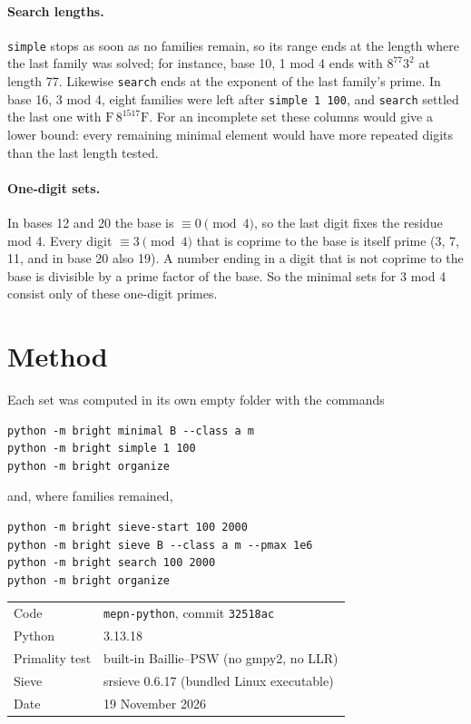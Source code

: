 \documentclass[11pt]{article}
\newcommand{\code}[1]{\texttt{#1}}
\begin{document}
\paragraph{Search lengths.} \code{simple} stops as soon as no families remain, so its range ends at the length where the last family was solved; for instance, base 10, 1 mod 4 ends with $8^{77}3^2$ at length 77. Likewise \code{search} ends at the exponent of the last family's prime. In base 16, 3 mod 4, eight families were left after \code{simple 1 100}, and \code{search} settled the last one with $\mathrm{F}\,8^{1517}\mathrm{F}$. For an incomplete set these columns would give a lower bound: every remaining minimal element would have more repeated digits than the last length tested.

\paragraph{One-digit sets.} In bases 12 and 20 the base is $\equiv 0 \pmod 4$, so the last digit fixes the residue mod 4. Every digit $\equiv 3 \pmod 4$ that is coprime to the base is itself prime (3, 7, 11, and in base 20 also 19). A number ending in a digit that is not coprime to the base is divisible by a prime factor of the base. So the minimal sets for 3 mod 4 consist only of these one-digit primes.

\section{Method}

Each set was computed in its own empty folder with the commands
\begin{verbatim}
python -m bright minimal B --class a m
python -m bright simple 1 100
python -m bright organize
\end{verbatim}
and, where families remained,
\begin{verbatim}
python -m bright sieve-start 100 2000
python -m bright sieve B --class a m --pmax 1e6
python -m bright search 100 2000
python -m bright organize
\end{verbatim}

\begin{center}
\begin{tabular}{@{}ll@{}}
\toprule
Code & \code{mepn-python}, commit \code{32518ac} \\
Python & 3.13.18 \\
Primality test & built-in Baillie--PSW (no gmpy2, no LLR) \\
Sieve & srsieve 0.6.17 (bundled Linux executable) \\
Date & 19 November 2026 \\
\bottomrule
\end{tabular}
\end{center}
\end{document}
